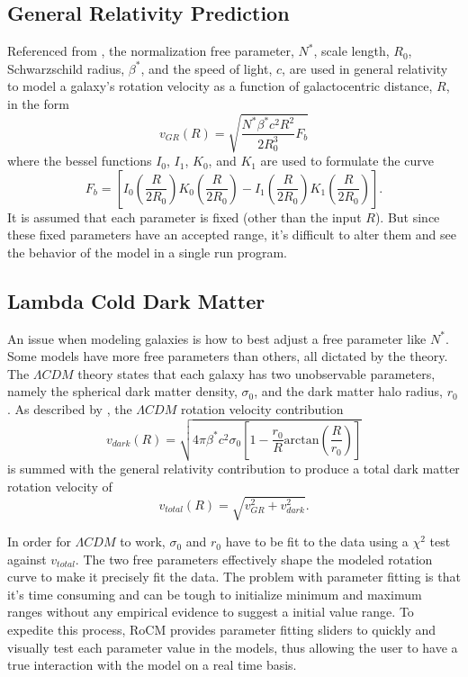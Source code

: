 \documentclass[conference]{IEEEtran-modified}
\begin{document}
\subsection{General Relativity Prediction}

Referenced from \cite{mannheim}, the normalization free parameter, $N^*$, scale length, $R_0$, Schwarzschild radius, $\beta^*$, and the speed of light, $c$, are used in general relativity to model a galaxy's rotation velocity as a function of galactocentric distance, $R$, in the form
\begin{equation}
v_{GR}(R) = \sqrt{\frac{N^*\beta^*c^2R^2}{2R^3_0}F_b}
\end{equation}
where the bessel functions $I_0$, $I_1$, $K_0$, and $K_1$ are used to formulate the curve
\begin{equation}
F_b = \left[I_0\left(\frac{R}{2R_0}\right)K_0\left(\frac{R}{2R_0}\right)-I_1\left(\frac{R}{2R_0}\right)K_1\left(\frac{R}{2R_0}\right)\right].
\end{equation}
It is assumed that each parameter is fixed (other than the input $R$). But since these fixed parameters have an accepted range, it's difficult to alter them and see the behavior of the model in a single run program.   


\subsection{Lambda Cold Dark Matter}
An issue when modeling galaxies is how to best adjust a free parameter like $N^*$. Some models have more free parameters than others, all dictated by the theory. The $\Lambda CDM$ theory states that each galaxy has two unobservable parameters, namely the spherical dark matter density, $\sigma_0$, and the dark matter halo radius, $r_0$. As described by \cite{mannheim}, the $\Lambda CDM$ rotation velocity contribution
\begin{equation}
v_{dark}(R) = \sqrt{4\pi\beta^*c^2\sigma_0\left[1-\frac{r_0}{R}\text{arctan}\left(\frac{R}{r_0}\right)\right]}
\end{equation}
is summed with the general relativity contribution to produce a total dark matter rotation velocity of 
\begin{equation}
v_{total}(R) = \sqrt{v_{GR}^2 + v_{dark}^2}.
\end{equation}

In order for $\Lambda CDM$ to work, $\sigma_0$ and $r_0$ have to be fit to the data using a $\chi^2$ test against $v_{total}$. The two free parameters effectively shape the modeled rotation curve to make it precisely fit the data. The problem with parameter fitting is that it's time consuming and can be tough to initialize minimum and maximum ranges without any empirical evidence to suggest a initial value range. To expedite this process, RoCM provides parameter fitting sliders to quickly and visually test each parameter value in the models, thus allowing the user to have a true interaction with the model on a real time basis.
\end{document}
